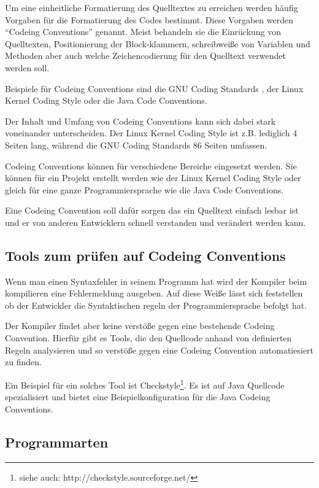 Um eine einheitliche Formatierung des Quelltextes zu erreichen werden häufig
Vorgaben für die Formatierung des Codes bestimmt. Diese Vorgaben werden
\enquote{Codeing Conventions} genannt. Meist behandeln sie die Einrückung von Quelltexten,
Positionierung der Block-klammern, schreibweiße von Variablen und Methoden aber auch
welche Zeichencodierung für den Quelltext verwendet werden soll.

Beispiele für Codeing Conventions sind die GNU Coding Standards \cite{GNUCode},
der Linux Kernel Coding Style\cite{KernelCode} oder die Java Code Conventions\cite{javacode}.

Der Inhalt und Umfang von Codeing Conventions kann sich dabei stark voneinander
unterscheiden. Der Linux Kernel Coding Style ist z.B. lediglich 4 Seiten lang,
während die GNU Coding Standards 86 Seiten umfassen.

Codeing Conventions können für verschiedene Bereiche eingesetzt werden. Sie können für
ein Projekt erstellt werden wie der Linux Kernel Coding Style oder gleich für eine
ganze Programmiersprache wie die Java Code Conventions.

Eine Codeing Convention soll dafür sorgen das ein Quelltext einfach lesbar ist
und er von anderen Entwicklern schnell verstanden und verändert werden kann.

\subsection{Tools zum prüfen auf Codeing Conventions}

Wenn man einen Syntaxfehler in seinem Programm hat wird
der Kompiler beim kompilieren eine Fehlermeldung ausgeben.
Auf diese Weiße lässt sich feststellen ob der Entwickler
die Syntaktischen regeln der Programmiersprache befolgt hat.

Der Kompiler findet aber keine verstöße gegen eine bestehende Codeing Convention.
Hierfür gibt es Tools, die den Quellcode anhand von definierten Regeln analysieren
und so verstöße gegen eine Codeing Convention automatiesiert zu finden.

Ein Beispiel für ein solches Tool ist Checkstyle\footnote{siehe auch: http://checkstyle.sourceforge.net/}.
Es ist auf Java Quellcode spezialisiert und bietet eine Beispielkonfiguration für
die Java Codeing Conventions.

\subsection{Programmarten}

